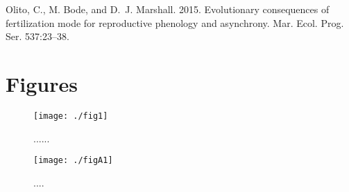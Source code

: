 \documentclass[11pt]{article}
\begin{document}
\newpage{}



\begin{thebibliography}{}

Olito, C., M. Bode, and D.~J. Marshall. 2015.
\newblock Evolutionary consequences of fertilization mode for reproductive phenology and asynchrony.
\newblock Mar. Ecol. Prog. Ser. 537:23--38.

\end{thebibliography}

\newpage{}

\section*{Figures}
 
\begin{figure}[!ht]
\texttt{[image: ./fig1]}
\caption{......}
\label{Fig:fig1.pdf}
\end{figure}
\newpage{}



\renewcommand{\thefigure}{A\arabic{figure}}
\setcounter{figure}{0}

\begin{figure}[!ht]
\texttt{[image: ./figA1]}
\caption{....}
\label{FigA:figA1.pdf}
\end{figure}
\newpage{}
\end{document}
